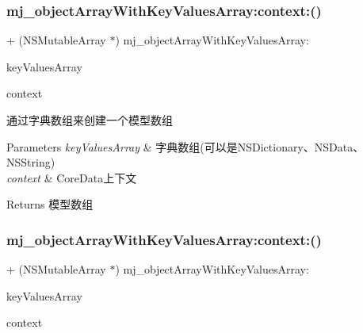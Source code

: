 \subsubsection{\texorpdfstring{mj\+\_\+object\+Array\+With\+Key\+Values\+Array\+:context\+:()}{mj\_objectArrayWithKeyValuesArray:context:()}\hspace{0.1cm}{\footnotesize\ttfamily [2/3]}}
{\footnotesize\ttfamily + (N\+S\+Mutable\+Array $\ast$) mj\+\_\+object\+Array\+With\+Key\+Values\+Array\+: \begin{DoxyParamCaption}\item[{(id)}]{key\+Values\+Array }\item[{context:(N\+S\+Managed\+Object\+Context $\ast$)}]{context }\end{DoxyParamCaption}}

通过字典数组来创建一个模型数组 
\begin{DoxyParams}{Parameters}
{\em key\+Values\+Array} & 字典数组(可以是\+N\+S\+Dictionary、\+N\+S\+Data、\+N\+S\+String) \\
\hline
{\em context} & Core\+Data上下文 \\
\hline
\end{DoxyParams}
\begin{DoxyReturn}{Returns}
模型数组 
\end{DoxyReturn}
\mbox{\label{category_n_s_object_07_m_j_key_value_08_a38ad57bdfe18e6432c8dc94569c3be7d}} 
\subsubsection{\texorpdfstring{mj\+\_\+object\+Array\+With\+Key\+Values\+Array\+:context\+:()}{mj\_objectArrayWithKeyValuesArray:context:()}\hspace{0.1cm}{\footnotesize\ttfamily [3/3]}}
{\footnotesize\ttfamily + (N\+S\+Mutable\+Array $\ast$) mj\+\_\+object\+Array\+With\+Key\+Values\+Array\+: \begin{DoxyParamCaption}\item[{(id)}]{key\+Values\+Array }\item[{context:(N\+S\+Managed\+Object\+Context $\ast$)}]{context }\end{DoxyParamCaption}}

